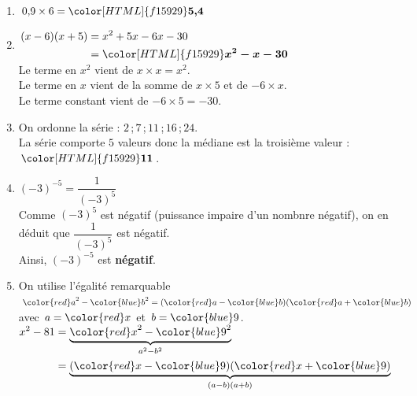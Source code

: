 \documentclass[a4paper,11pt,landscape,exos]{nsi} %
\begin{document}
\begin{multicols}{2}
\maketitle

\begin{enumerate}[itemsep=1em]
    \item $0{,}9 \times 6={\color[HTML]{f15929}\boldsymbol{5{,}4}}$
\item $\begin{aligned}
      (x-6)(x+5)&=x^2+5x-6x-30\\
      &={\color[HTML]{f15929}\boldsymbol{x^2-x-30}}
      \end{aligned}$\\Le terme en $x^2$ vient de $x\times x=x^2$.\\Le terme en $x$ vient de la somme de $x \times 5$ et de $-6 \times x$.\\Le terme constant vient de $-6\times 5= -30$.
\item On ordonne la série :  $2$\,;\,$7$\,;\,$11$\,;\,$16$\,;\,$24$.\\
      La série comporte $5$ valeurs donc la médiane est la troisième valeur : ${\color[HTML]{f15929}\boldsymbol{11}}$.
\item $(-3)^{-5}=\dfrac{1}{(-3)^{5}}$\\
     Comme  $(-3)^{5}$ est  négatif (puissance impaire d'un nombnre négatif), on en déduit que  $\dfrac{1}{(-3)^{5}}$ est négatif.\\
    Ainsi, $(-3)^{-5}$ est {\bfseries \color[HTML]{f15929}négatif}.
\item On utilise l'égalité remarquable ${\color{red} a}^2-{\color{blue} b}^2=({\color{red} a}-{\color{blue} b})({\color{red} a}+{\color{blue} b})$ avec $a={\color{red} x}$  et $b={\color{blue} 9}$.\\$\begin{aligned}
 x^2-81&=\underbrace{{\color{red} x}^2-{\color{blue} 9}^2}_{a^2-b^2}\\
 &=\underbrace{({\color{red} x}-{\color{blue} 9})({\color{red} x}+{\color{blue} 9})}_{(a-b)(a+b)}
 \end{aligned}$ \\

\end{enumerate}
\end{multicols}
\end{document}
